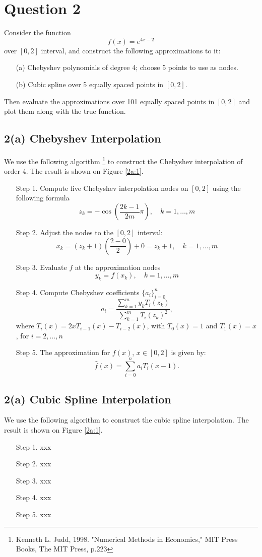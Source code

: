 \documentclass[11pt]{article}
\newcommand{\1}{\mathbbm{1}}
\newcounter{daggerfootnote}
\newcommand*{\daggerfootnote}[1]{%
	\setcounter{daggerfootnote}{\value{footnote}}%
	\renewcommand*{\thefootnote}{\fnsymbol{footnote}}%
	\footnote[2]{#1}%
	\setcounter{footnote}{\value{daggerfootnote}}%
	\renewcommand*{\thefootnote}{\arabic{footnote}}%
}
\begin{document}
\section*{Question 2}
Consider the function 
\[f (x ) = e^{4x-2} \]
over $[0,2]$ interval, and construct the following approximations
to it:
\begin{enumerate}
	\item[(a)] Chebyshev polynomials of degree 4; choose 5 points to use as nodes.
	\item[(b)] Cubic spline over 5 equally spaced points in $[0,2]$.
\end{enumerate}
Then evaluate the approximations over 101 equally spaced points in $[0,2]$ and plot them along with the true function. 

\subsection*{2(a) Chebyshev Interpolation}
We use the following algorithm\daggerfootnote{Kenneth L. Judd, 1998. "Numerical Methods in Economics," MIT Press Books, The MIT Press, p.223} to construct the Chebyshev interpolation of order 4. The result is shown on Figure \ref{2a:1}.
\begin{enumerate}
	\item [Step 1.] Compute five Chebyshev interpolation nodes on $[0,2]$ using the following formula
	\[z_k = -\cos\left(\frac{2k-1}{2m}\pi\right), \quad k=1,\ldots,m\]
	\item[Step 2.] Adjust the nodes to the $[0,2]$ interval:
	\[x_k=(z_k+1)\left(\frac{2-0}{2}\right)+0=z_k+1,\quad k=1,\ldots,m\]
	\item[Step 3.] Evaluate $f$ at the approximation nodes
	\[y_k=f(x_k), \quad k=1,\ldots,m\]
	\item[Step 4.] Compute Chebyshev coefficients $\{a_i\}_{i=0}^n$
	\[a_i=\frac{\sum_{k=1}^my_kT_i(z_k)}{\sum_{k=1}^mT_i(z_k)^2},\]
	where $T_i(x)=2xT_{i-1}(x)-T_{i-2}(x)$, with $T_0(x)=1$ and $T_1(x)=x$, for $i=2,\ldots,n$
	\item[Step 5.] The approximation for $f(x)$, $x\in[0,2]$ is given by:
	\[\hat{f}(x)=\sum_{i=0}^n a_iT_i\left(x-1\right).\]
\end{enumerate}


\subsection*{2(a) Cubic Spline Interpolation}
We use the following algorithm to construct the cubic spline interpolation. The result is shown on Figure \ref{2a:1}.
\begin{enumerate}
	\item [Step 1.] xxx
	\item[Step 2.] xxx
	\item[Step 3.] xxx
	\item[Step 4.] xxx
	\item[Step 5.] xxx
\end{enumerate}
\end{document}
